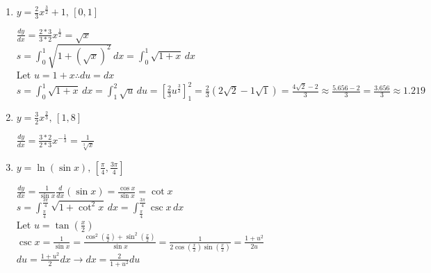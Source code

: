 \documentclass[10pt,letterpaper]{report}
\begin{document}
\begin{enumerate}
  \item{$y=\frac{2}{3}x^{\frac{3}{2}}+1, \, [0, 1]$ \\}
  
    $\frac{dy}{dx}=\frac{2*3}{3*2}x^{\frac{1}{2}}=\sqrt{x}$ \\
    
    $s=\int_{0}^{1}{\sqrt{1+\left(\sqrt{x}\right)^{2}}}\,dx=\int_{0}^{1}{\sqrt{1+x}}\,dx$ \\
    
    Let $u=1+x\therefore du=dx$ \\
    
    $s=\int_{0}^{1}{\sqrt{1+x}}\,dx=\int_{1}^{2}{\sqrt{u}}\,du=\left[\frac{2}{3}u^{\frac{3}{2}}\right]_{1}^{2}=\frac{2}{3}\left(2\sqrt{2}-1\sqrt{1}\right)=\frac{4\sqrt{2}-2}{3}\approx\frac{5.656-2}{3}=\frac{3.656}{3}\approx 1.219$ \\
    
  \item{$y=\frac{3}{2}x^{\frac{2}{3}}, \, [1,8]$ \\}
  
    $\frac{dy}{dx}=\frac{3*2}{2*3}x^{-\frac{1}{3}}=\frac{1}{\sqrt[3]{x}}$ \\
    
  \item{$y=\ln{\left(\sin{x}\right)}, \, \left[\frac{\pi}{4}, \frac{3\pi}{4}\right]$ \\}
  
    $\frac{dy}{dx}=\frac{1}{\sin{x}}\frac{d}{dx}\left(\sin{x}\right)=\frac{\cos{x}}{\sin{x}}=\cot{x}$ \\
    
    $s=\int_{\frac{\pi}{4}}^{\frac{3\pi}{4}}{\sqrt{1+\cot^{2}{x}}}\,dx=\int_{\frac{\pi}{4}}^{\frac{3\pi}{4}}{\csc{x}}\,dx$ \\
    
    Let $u=\tan{\left(\frac{x}{2}\right)}$ \\
    
    $\csc{x}=\frac{1}{\sin{x}}=\frac{\cos^{2}{\left(\frac{x}{2}\right)}+\sin^{2}{\left(\frac{x}{2}\right)}}{\sin{x}}=\frac{1}{2\cos{\left(\frac{x}{2}\right)}\sin{\left(\frac{x}{2}\right)}}=\frac{1+u^{2}}{2u}$ \\
    
    $du=\frac{1+u^{2}}{2}dx\rightarrow dx=\frac{2}{1+u^{2}}du$ \\
\end{enumerate}
\end{document}
